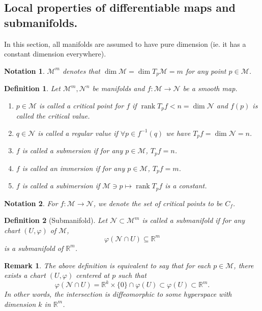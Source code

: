 \documentclass[8pt]{article}
\newtheorem{definition}{Definition}[section]
\newtheorem{notation}{Notation}[section]
\newtheorem{remark}{Remark}[section]
\DeclareMathOperator{\rank}{rank}
\newcommand{\R}[0]{\mathbb{R}}
\newcommand{\M}[0]{\mathcal{M}}
\newcommand{\maniN}[0]{\mathcal{N}}
\begin{document}
\subsection{Local properties of differentiable maps and submanifolds.}
In this section, all manifolds are assumed to have pure dimension (ie. it has a constant dimension everywhere). 
\begin{notation}
$\M^m$ denotes that $\dim\M = \dim T_p\M=m$ for any point $p\in\M$.
\end{notation}
\begin{definition}
  Let $\M^m,\maniN^n$ be manifolds and $f:\M\to\maniN$ be a smooth map.
  \begin{enumerate}[1).]
    \item $p\in\M$ is called a critical point for $f$ if $\rank T_pf<n=\dim\maniN$ and $f(p)$ is called the critical value.
    \item $q\in\maniN$ is called a regular value if $\forall p\in f^{-1}(q)$ we have $T_pf = \dim\maniN = n$. 
    \item $f$ is called a submersion if for any $p\in\M$, $T_pf = n$.
    \item $f$ is called an immersion if for any $p\in\M$, $T_pf = m$.
    \item $f$ is called a subimersion if $\M\ni p\mapsto\rank T_pf$ is a constant.
  \end{enumerate}
\end{definition}
\begin{notation}
  For $f:\M\to\maniN$, we denote the set of critical points to be $C_f$.
\end{notation}
\begin{definition}[Submanifold]
  Let $\maniN\subset\M^m$ is called a submanifold if for any chart $(U,\varphi)$ of $\M$, 
  \begin{equation*}
    \varphi(\maniN\cap U)\subseteq\R^m
  \end{equation*}
  is a submanifold of $\R^m$.
\end{definition}
\begin{remark}
  The above definition is equivalent to say that for each $p\in\M$, there exists a chart $(U,\varphi)$ centered at $p$ such that 
  \begin{equation*}
    \varphi(\maniN\cap U) = \R^k\times\{0\}\cap\varphi(U)\subset\varphi(U)\subset\R^m.
  \end{equation*}
  In other words, the intersection is diffeomorphic to some hyperspace with dimension $k$ in $\R^m$. 
\end{remark}
\end{document}
